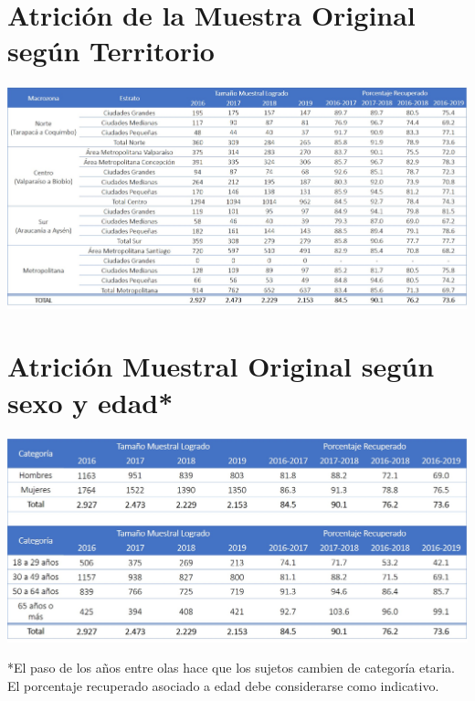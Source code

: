 \documentclass[
  12pt,
]{book}
\begin{document}
\hypertarget{atriciuxf3n-de-la-muestra-original-seguxfan-territorio}{%
\section{Atrición de la Muestra Original según Territorio}\label{atriciuxf3n-de-la-muestra-original-seguxfan-territorio}}

\begin{center}\includegraphics[width=1.5\linewidth,height=1.5\textheight]{inputs/images/atricion_territorio} \end{center}

\hypertarget{atriciuxf3n-muestral-original-seguxfan-sexo-y-edad}{%
\section{Atrición Muestral Original según sexo y edad*}\label{atriciuxf3n-muestral-original-seguxfan-sexo-y-edad}}

\begin{center}\includegraphics[width=1.5\linewidth,height=1.5\textheight]{inputs/images/atricion_sexo_edad} \end{center}

*El paso de los años entre olas hace que los sujetos cambien de categoría etaria. El porcentaje recuperado asociado a edad debe considerarse como indicativo.
\end{document}
